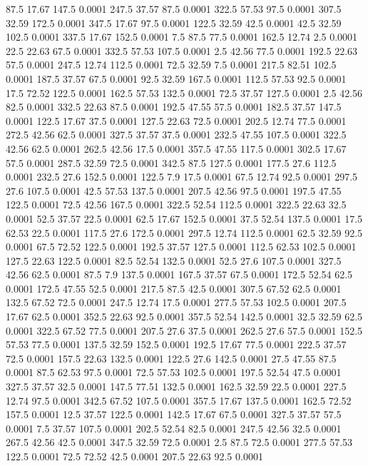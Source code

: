 87.5	17.67	147.5	0.0001
247.5	37.57	87.5	0.0001
322.5	57.53	97.5	0.0001
307.5	32.59	172.5	0.0001
347.5	17.67	97.5	0.0001
122.5	32.59	42.5	0.0001
42.5	32.59	102.5	0.0001
337.5	17.67	152.5	0.0001
7.5	87.5	77.5	0.0001
162.5	12.74	2.5	0.0001
22.5	22.63	67.5	0.0001
332.5	57.53	107.5	0.0001
2.5	42.56	77.5	0.0001
192.5	22.63	57.5	0.0001
247.5	12.74	112.5	0.0001
72.5	32.59	7.5	0.0001
217.5	82.51	102.5	0.0001
187.5	37.57	67.5	0.0001
92.5	32.59	167.5	0.0001
112.5	57.53	92.5	0.0001
17.5	72.52	122.5	0.0001
162.5	57.53	132.5	0.0001
72.5	37.57	127.5	0.0001
2.5	42.56	82.5	0.0001
332.5	22.63	87.5	0.0001
192.5	47.55	57.5	0.0001
182.5	37.57	147.5	0.0001
122.5	17.67	37.5	0.0001
127.5	22.63	72.5	0.0001
202.5	12.74	77.5	0.0001
272.5	42.56	62.5	0.0001
327.5	37.57	37.5	0.0001
232.5	47.55	107.5	0.0001
322.5	42.56	62.5	0.0001
262.5	42.56	17.5	0.0001
357.5	47.55	117.5	0.0001
302.5	17.67	57.5	0.0001
287.5	32.59	72.5	0.0001
342.5	87.5	127.5	0.0001
177.5	27.6	112.5	0.0001
232.5	27.6	152.5	0.0001
122.5	7.9	17.5	0.0001
67.5	12.74	92.5	0.0001
297.5	27.6	107.5	0.0001
42.5	57.53	137.5	0.0001
207.5	42.56	97.5	0.0001
197.5	47.55	122.5	0.0001
72.5	42.56	167.5	0.0001
322.5	52.54	112.5	0.0001
322.5	22.63	32.5	0.0001
52.5	37.57	22.5	0.0001
62.5	17.67	152.5	0.0001
37.5	52.54	137.5	0.0001
17.5	62.53	22.5	0.0001
117.5	27.6	172.5	0.0001
297.5	12.74	112.5	0.0001
62.5	32.59	92.5	0.0001
67.5	72.52	122.5	0.0001
192.5	37.57	127.5	0.0001
112.5	62.53	102.5	0.0001
127.5	22.63	122.5	0.0001
82.5	52.54	132.5	0.0001
52.5	27.6	107.5	0.0001
327.5	42.56	62.5	0.0001
87.5	7.9	137.5	0.0001
167.5	37.57	67.5	0.0001
172.5	52.54	62.5	0.0001
172.5	47.55	52.5	0.0001
217.5	87.5	42.5	0.0001
307.5	67.52	62.5	0.0001
132.5	67.52	72.5	0.0001
247.5	12.74	17.5	0.0001
277.5	57.53	102.5	0.0001
207.5	17.67	62.5	0.0001
352.5	22.63	92.5	0.0001
357.5	52.54	142.5	0.0001
32.5	32.59	62.5	0.0001
322.5	67.52	77.5	0.0001
207.5	27.6	37.5	0.0001
262.5	27.6	57.5	0.0001
152.5	57.53	77.5	0.0001
137.5	32.59	152.5	0.0001
192.5	17.67	77.5	0.0001
222.5	37.57	72.5	0.0001
157.5	22.63	132.5	0.0001
122.5	27.6	142.5	0.0001
27.5	47.55	87.5	0.0001
87.5	62.53	97.5	0.0001
72.5	57.53	102.5	0.0001
197.5	52.54	47.5	0.0001
327.5	37.57	32.5	0.0001
147.5	77.51	132.5	0.0001
162.5	32.59	22.5	0.0001
227.5	12.74	97.5	0.0001
342.5	67.52	107.5	0.0001
357.5	17.67	137.5	0.0001
162.5	72.52	157.5	0.0001
12.5	37.57	122.5	0.0001
142.5	17.67	67.5	0.0001
327.5	37.57	57.5	0.0001
7.5	37.57	107.5	0.0001
202.5	52.54	82.5	0.0001
247.5	42.56	32.5	0.0001
267.5	42.56	42.5	0.0001
347.5	32.59	72.5	0.0001
2.5	87.5	72.5	0.0001
277.5	57.53	122.5	0.0001
72.5	72.52	42.5	0.0001
207.5	22.63	92.5	0.0001
